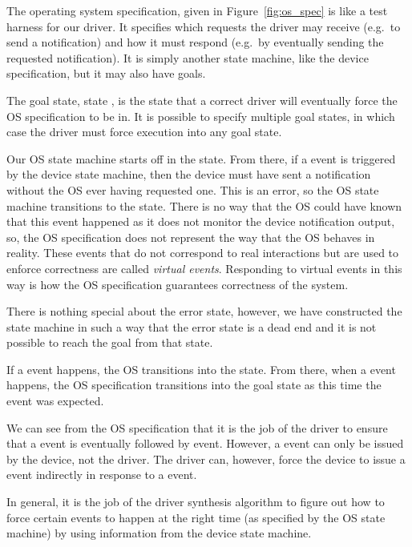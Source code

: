 The operating system specification, given in Figure~\ref{fig:os_spec} is like a test harness for our driver. It specifies which requests the driver may receive (e.g.\ to send a notification) and how it must respond (e.g.\ by eventually sending the requested notification). It is simply another state machine, like the device specification, but it may also have goals.

The goal state, state , is the state that a correct driver will eventually force the OS specification to be in. It is possible to specify multiple goal states, in which case the driver must force execution into any goal state.

Our OS state machine starts off in the  state. From there, if a  event is triggered by the device state machine, then the device must have sent a notification without the OS ever having requested one. This is an error, so the OS state machine transitions to the  state. There is no way that the OS could have known that this event happened as it does not monitor the device notification output, so, the OS specification does not represent the way that the OS behaves in reality. These events that do not correspond to real interactions but are used to enforce correctness are called \emph{virtual events}. Responding to virtual events in this way is how the OS specification guarantees correctness of the system. 

There is nothing special about the error state, however, we have constructed the state machine in such a way that the error state is a dead end and it is not possible to reach the goal from that state.

If a  event happens, the OS transitions into the  state. From there, when a  event happens, the OS specification transitions into the goal state as this time the  event was expected. 

We can see from the OS specification that it is the job of the driver to ensure that a  event is eventually followed by  event. However, a  event can only be issued by the device, not the driver. The driver can, however, force the device to issue a  event indirectly in response to a  event. 

In general, it is the job of the driver synthesis algorithm to figure out how to force certain events to happen at the right time (as specified by the OS state machine) by using information from the device state machine. 

